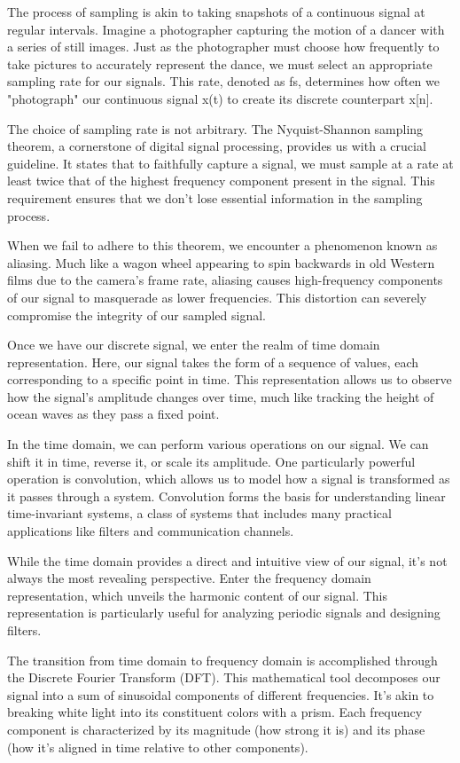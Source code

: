 The process of sampling is akin to taking snapshots of a continuous signal at regular intervals. Imagine a photographer capturing the motion of a dancer with a series of still images. Just as the photographer must choose how frequently to take pictures to accurately represent the dance, we must select an appropriate sampling rate for our signals. This rate, denoted as fs, determines how often we "photograph" our continuous signal x(t) to create its discrete counterpart x[n].

The choice of sampling rate is not arbitrary. The Nyquist-Shannon sampling theorem, a cornerstone of digital signal processing, provides us with a crucial guideline. It states that to faithfully capture a signal, we must sample at a rate at least twice that of the highest frequency component present in the signal. This requirement ensures that we don't lose essential information in the sampling process.

When we fail to adhere to this theorem, we encounter a phenomenon known as aliasing. Much like a wagon wheel appearing to spin backwards in old Western films due to the camera's frame rate, aliasing causes high-frequency components of our signal to masquerade as lower frequencies. This distortion can severely compromise the integrity of our sampled signal.

Once we have our discrete signal, we enter the realm of time domain representation. Here, our signal takes the form of a sequence of values, each corresponding to a specific point in time. This representation allows us to observe how the signal's amplitude changes over time, much like tracking the height of ocean waves as they pass a fixed point.

In the time domain, we can perform various operations on our signal. We can shift it in time, reverse it, or scale its amplitude. One particularly powerful operation is convolution, which allows us to model how a signal is transformed as it passes through a system. Convolution forms the basis for understanding linear time-invariant systems, a class of systems that includes many practical applications like filters and communication channels.

While the time domain provides a direct and intuitive view of our signal, it's not always the most revealing perspective. Enter the frequency domain representation, which unveils the harmonic content of our signal. This representation is particularly useful for analyzing periodic signals and designing filters.

The transition from time domain to frequency domain is accomplished through the Discrete Fourier Transform (DFT). This mathematical tool decomposes our signal into a sum of sinusoidal components of different frequencies. It's akin to breaking white light into its constituent colors with a prism. Each frequency component is characterized by its magnitude (how strong it is) and its phase (how it's aligned in time relative to other components).

